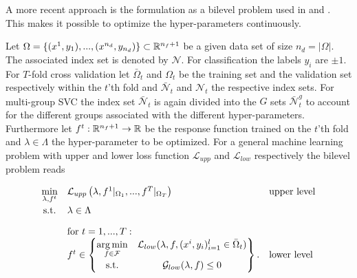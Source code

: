 
A more recent approach is the formulation as a bilevel problem used in \cite{Kunapuli2008} and \cite{Moore2011}.
This makes it possible to optimize the hyper-parameters continuously.


Let \(\Omega = \{(x^1,y_1),...,(x^{n_d},y_{n_d})\} \subset \mathbb{R}^{n_f+1}\) be a given data set of size \(n_d = |\Omega|\). The associated index set is denoted by \(\mathcal{N}\). For classification the labels \(y_i\) are \(\pm1\).
For \(T\)-fold cross validation let \(\bar{\Omega}_t\) and \(\Omega_t\) be the training set and the validation set respectively within the \(t\)'th fold and \(\bar{\mathcal{N}}_t\) and \(\mathcal{N}_t\) the respective index sets. For multi-group SVC the index set \(\bar{\mathcal{N}}_t\) is again divided into the \(G\) sets \(\bar{\mathcal{N}}_t^g\) to account for the different groups associated with the different hyper-parameters.
Furthermore let \(f^t:\mathbb{R}^{n_f+1} \to \mathbb{R}\) be the response function trained on the \(t\)'th fold and \(\lambda \in \Lambda\) the hyper-parameter to be optimized.
For a general machine learning problem with upper and lower loss function \(\mathcal{L}_{upp}\) and \(\mathcal{L}_{low}\) respectively the bilevel problem reads
 

\begin{equation*}
	\begin{array}{cll}
	\displaystyle\min_{\lambda, f^t} & \mathcal{L}_{upp}\left(\lambda,f^1|_{\Omega_1},...,f^T|_{\Omega_T}\right) & \text{upper level} \vspace{0.5ex}\\
	\text{s.t.} & \lambda \in \Lambda & \vspace{1em}\\
	& \text{for } t = 1,...,T: & \\
	& f^t \in \begin{Bmatrix} \displaystyle\argmin_{f\in \mathcal{F}} & \mathcal{L}_{low}(\lambda,f,(x^i,y_i)_{i = 1}^l\in \bar{\Omega}_t) \vspace{0.5ex}\\
	                        \text{s.t.} & \mathcal{G}_{low}(\lambda,f) \leq 0 
													\end{Bmatrix}. & \text{lower level}
	\end{array}
\end{equation*}

